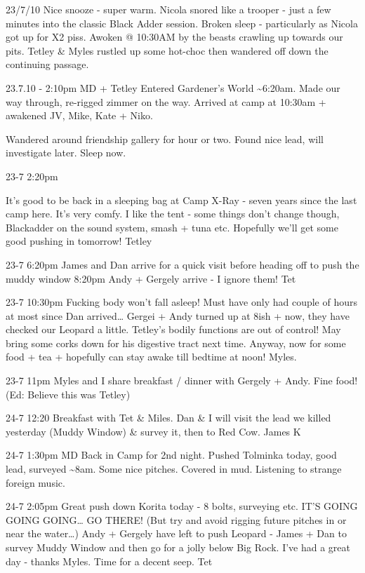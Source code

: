 23/7/10 Nice snooze - super warm. Nicola snored like a trooper - just a
few minutes into the classic Black Adder session. Broken sleep -
particularly as Nicola got up for X2 piss. Awoken @ 10:30AM by the
beasts crawling up towards our pits. Tetley \& Myles rustled up some
hot-choc then wandered off down the continuing passage.

23.7.10 - 2:10pm MD + Tetley Entered Gardener's World
\textasciitilde{}6:20am. Made our way through, re-rigged zimmer on the
way. Arrived at camp at 10:30am + awakened JV, Mike, Kate + Niko.

Wandered around friendship gallery for hour or two. Found nice lead,
will investigate later. Sleep now.

23-7 2:20pm

It's good to be back in a sleeping bag at Camp X-Ray - seven years since
the last camp here. It's very comfy. I like the tent - some things don't
change though, Blackadder on the sound system, smash + tuna etc.
Hopefully we'll get some good pushing in tomorrow! Tetley

23-7 6:20pm James and Dan arrive for a quick visit before heading off to
push the muddy window 8:20pm Andy + Gergely arrive - I ignore them! Tet

23-7 10:30pm Fucking body won't fall asleep! Must have only had couple
of hours at most since Dan arrived\ldots{} Gergei + Andy turned up at
8ish + now, they have checked our Leopard a little. Tetley's bodily
functions are out of control! May bring some corks down for his
digestive tract next time. Anyway, now for some food + tea + hopefully
can stay awake till bedtime at noon! Myles.

23-7 11pm Myles and I share breakfast / dinner with Gergely + Andy. Fine
food! (Ed: Believe this was Tetley)

24-7 12:20 Breakfast with Tet \& Miles. Dan \& I will visit the lead we
killed yesterday (Muddy Window) \& survey it, then to Red Cow. James K

24-7 1:30pm MD Back in Camp for 2nd night. Pushed Tolminka today, good
lead, surveyed \textasciitilde{}8am. Some nice pitches. Covered in mud.
Listening to strange foreign music.

24-7 2:05pm Great push down Korita today - 8 bolts, surveying etc. IT'S
GOING GOING GOING\ldots{} GO THERE! (But try and avoid rigging future
pitches in or near the water\ldots{}) Andy + Gergely have left to push
Leopard - James + Dan to survey Muddy Window and then go for a jolly
below Big Rock. I've had a great day - thanks Myles. Time for a decent
seep. Tet

